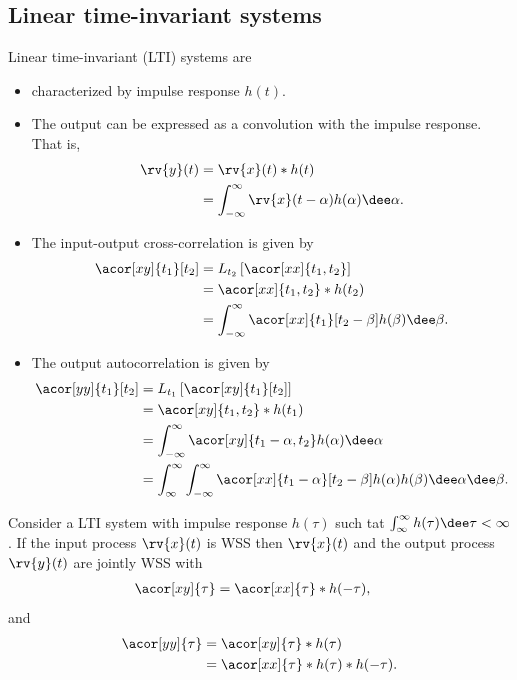 \subsection{Linear time-invariant systems}
Linear time-invariant (LTI) systems are 
\begin{itemize}
    \item characterized by impulse response $h(t)$.
    \item The output can be expressed as a convolution with the impulse response. That is,
    \begin{align}
        \rv{y}(t) &= \rv{x}(t) \ast h(t)\\
        &= \int_{-\infty}^{\infty}\rv{x}(t - \alpha)h(\alpha)\dee\alpha.
    \end{align}
    \item The input-output cross-correlation is given by
    \begin{align}
        \acor[xy]{t_{1}}[t_{2}] &= L_{t_{2}}\left[ \acor[xx]{t_{1}, t_{2}} \right]\\
        &= \acor[xx]{t_{1}, t_{2}}\ast h(t_{2})\\
        &= \int_{-\infty}^{\infty} \acor[xx]{t_{1}}[t_{2} - \beta]h(\beta)\dee\beta.
    \end{align}
    \item The output autocorrelation is given by
    \begin{align}
        \acor[yy]{t_{1}}[t_{2}] &= L_{t_{1}}\left[ \acor[xy]{t_{1}}[t_{2}] \right]\\
        &= \acor[xy]{t_{1},t_{2}}\ast h(t_{1})\\
        &= \int_{-\infty}^{\infty} \acor[xy]{t_{1} - \alpha, t_{2}} h(\alpha)\dee\alpha\\
        &= \int_{\infty}^{\infty}\int_{-\infty}^{\infty} \acor[xx]{t_{1} - \alpha}[t_{2} - \beta]h(\alpha)h(\beta)\dee\alpha\dee\beta.
    \end{align}
\end{itemize}

\begin{theoremBox}
     Consider a LTI system with impulse response $h(\tau)$ such tat $\int_{\infty}^{\infty}h(\tau)\dee\tau<\infty$. If the input process $\rv{x}(t)$ is WSS then $\rv{x}(t)$ and the output process $\rv{y}(t)$ are jointly WSS with 
     \begin{align}
         \acor[xy]{\tau} &= \acor[xx]{\tau}\ast h(-\tau),
     \end{align}
     and
     \begin{align}
         \acor[yy]{\tau} &= \acor[xy]{\tau}\ast h(\tau)\\
         &= \acor[xx]{\tau}\ast h(\tau) \ast h(-\tau).
     \end{align}
\end{theoremBox}

